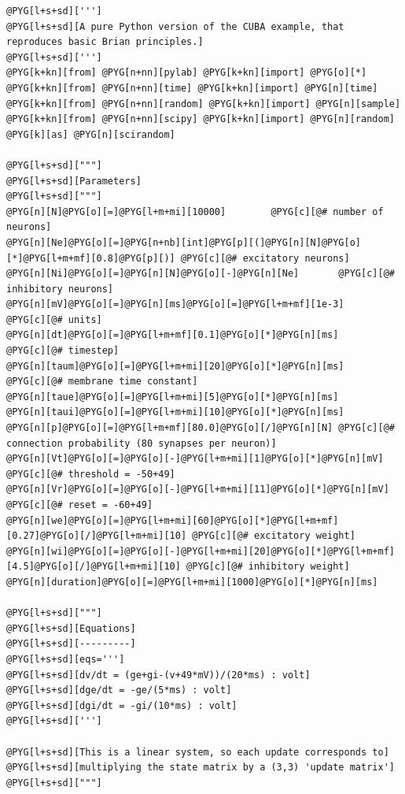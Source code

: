 \documentclass[letterpaper,10pt,english]{manual}
\begin{document}
\begin{Verbatim}[commandchars=@\[\]]
@PYG[l+s+sd][''']
@PYG[l+s+sd][A pure Python version of the CUBA example, that reproduces basic Brian principles.]
@PYG[l+s+sd][''']
@PYG[k+kn][from] @PYG[n+nn][pylab] @PYG[k+kn][import] @PYG[o][*]
@PYG[k+kn][from] @PYG[n+nn][time] @PYG[k+kn][import] @PYG[n][time]
@PYG[k+kn][from] @PYG[n+nn][random] @PYG[k+kn][import] @PYG[n][sample]
@PYG[k+kn][from] @PYG[n+nn][scipy] @PYG[k+kn][import] @PYG[n][random] @PYG[k][as] @PYG[n][scirandom]

@PYG[l+s+sd]["""]
@PYG[l+s+sd][Parameters]
@PYG[l+s+sd]["""]
@PYG[n][N]@PYG[o][=]@PYG[l+m+mi][10000]        @PYG[c][@# number of neurons]
@PYG[n][Ne]@PYG[o][=]@PYG[n+nb][int]@PYG[p][(]@PYG[n][N]@PYG[o][*]@PYG[l+m+mf][0.8]@PYG[p][)] @PYG[c][@# excitatory neurons]
@PYG[n][Ni]@PYG[o][=]@PYG[n][N]@PYG[o][-]@PYG[n][Ne]       @PYG[c][@# inhibitory neurons]
@PYG[n][mV]@PYG[o][=]@PYG[n][ms]@PYG[o][=]@PYG[l+m+mf][1e-3]    @PYG[c][@# units]
@PYG[n][dt]@PYG[o][=]@PYG[l+m+mf][0.1]@PYG[o][*]@PYG[n][ms]     @PYG[c][@# timestep]
@PYG[n][taum]@PYG[o][=]@PYG[l+m+mi][20]@PYG[o][*]@PYG[n][ms]    @PYG[c][@# membrane time constant]
@PYG[n][taue]@PYG[o][=]@PYG[l+m+mi][5]@PYG[o][*]@PYG[n][ms]
@PYG[n][taui]@PYG[o][=]@PYG[l+m+mi][10]@PYG[o][*]@PYG[n][ms]
@PYG[n][p]@PYG[o][=]@PYG[l+m+mf][80.0]@PYG[o][/]@PYG[n][N] @PYG[c][@# connection probability (80 synapses per neuron)]
@PYG[n][Vt]@PYG[o][=]@PYG[o][-]@PYG[l+m+mi][1]@PYG[o][*]@PYG[n][mV]      @PYG[c][@# threshold = -50+49]
@PYG[n][Vr]@PYG[o][=]@PYG[o][-]@PYG[l+m+mi][11]@PYG[o][*]@PYG[n][mV]     @PYG[c][@# reset = -60+49]
@PYG[n][we]@PYG[o][=]@PYG[l+m+mi][60]@PYG[o][*]@PYG[l+m+mf][0.27]@PYG[o][/]@PYG[l+m+mi][10] @PYG[c][@# excitatory weight]
@PYG[n][wi]@PYG[o][=]@PYG[o][-]@PYG[l+m+mi][20]@PYG[o][*]@PYG[l+m+mf][4.5]@PYG[o][/]@PYG[l+m+mi][10] @PYG[c][@# inhibitory weight]
@PYG[n][duration]@PYG[o][=]@PYG[l+m+mi][1000]@PYG[o][*]@PYG[n][ms]

@PYG[l+s+sd]["""]
@PYG[l+s+sd][Equations]
@PYG[l+s+sd][---------]
@PYG[l+s+sd][eqs=''']
@PYG[l+s+sd][dv/dt = (ge+gi-(v+49*mV))/(20*ms) : volt]
@PYG[l+s+sd][dge/dt = -ge/(5*ms) : volt]
@PYG[l+s+sd][dgi/dt = -gi/(10*ms) : volt]
@PYG[l+s+sd][''']

@PYG[l+s+sd][This is a linear system, so each update corresponds to]
@PYG[l+s+sd][multiplying the state matrix by a (3,3) 'update matrix']
@PYG[l+s+sd]["""]


\end{Verbatim}
\end{document}
